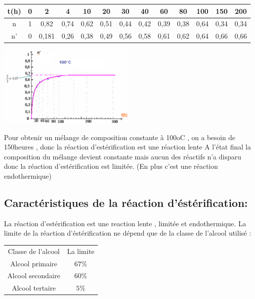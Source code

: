 \documentclass[12pt]{article}
\begin{document}
\begin{center}
\begin{tabular}{||c|c|c|c|c|c|c|c|c|c|c|c|c||} 
 \hline
 t(h) &0&2&4&10&20&30&40&60&80&100&150&200\\ [0.5ex] 
 \hline
 n &1&0,82&0,74&0,62&0,51&0,44&0,42&0,39&0,38&0,64&0,34&0,34\\ [0.5ex] 
 \hline
 n' &0&0,181&0,26&0,38&0,49&0,56&0,58&0,61&0,62&0,64&0,66&0,66\\ [0.5ex] 


 \hline
 \hline
\end{tabular}
\end{center}


\begin{center}
	\includegraphics[width=0.5\textwidth]{./img/img00.png}
\end{center}



Pour obtenir un mélange de composition constante à 100oC , on a besoin de 150heures , donc la réaction d'estérification
est une réaction lente
A l'état final la composition du mélange devient constante mais aucun des réactifs n'a disparu donc la réaction d'estérification est
limitée. (En plus c’est une réaction endothermique)

\subsection{Caractéristiques de la réaction d'éstérification:}
La réaction d'estérification est une reaction lente , limitée et endothermique.
La limite de la réaction d'éstérification ne dépend que de la classe de l'alcool utilisé :

\begin{center}
\begin{tabular}{||c|c||} 
 \hline
 Classe de l'alcool &La limite\\ [0.5ex] 
 Alcool primaire &$67\%$\\ [0.5ex] 
 Alcool secondaire &$60\%$\\ [0.5ex] 
 Alcool tertaire &$5\%$\\ [0.5ex] 
 \hline
 \hline
\end{tabular}
\end{center}
\end{document}
